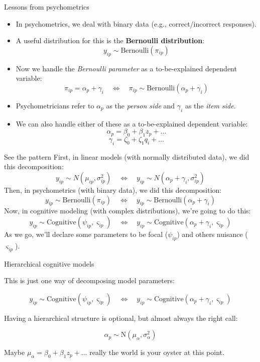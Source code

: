 \documentclass[aspectratio=169]{beamer}
\begin{document}
\begin{frame}[fragile]{Lessons from psychometrics}
    \begin{itemize}
        \item In psychometrics, we deal with binary data (e.g., correct/incorrect responses).
        \pause
        \item A useful distribution for this is the \textbf{Bernoulli distribution}:
        $$y_{ip} \sim \text{Bernoulli}(\pi_{ip})$$
        \pause
        \item Now we handle the \emph{Bernoulli parameter} as a to-be-explained dependent variable:
        $$ \pi_{ip} = \alpha_{p} + \gamma_{i} \quad \Leftrightarrow \quad \pi_{ip} \sim \text{Bernoulli}(\alpha_{p} + \gamma_{i}) $$
        \pause
        \item Psychometricians refer to $\alpha_{p}$ as the \emph{person side} and $\gamma_{i}$ as the \emph{item side}.
        \pause
        \item We can also handle either of these as a to-be-explained dependent variable:
        $$ \alpha_{p} = \beta_0 + \beta_1 z_p + \ldots$$
        $$ \gamma_{i} = \zeta_0 + \zeta_1 q_i + \ldots$$
    \end{itemize}
\end{frame}

\begin{frame}[fragile]{See the pattern}
    First, in linear models (with normally distributed data), we did this decomposition:
    $$y_{ip} \sim {N}(\mu_{ip}, \sigma^2_{ip}) \quad \Leftrightarrow \quad y_{ip} \sim N(\alpha_{p} + \gamma_{i}, \sigma^2_{ip})$$
    \pause
    Then, in psychometrics (with binary data), we did this decomposition:
    $$y_{ip} \sim \text{Bernoulli}(\pi_{ip}) \quad \Leftrightarrow \quad y_{ip} \sim \text{Bernoulli}(\alpha_{p} + \gamma_{i})$$
    \pause
    Now, in cognitive modeling (with complex distributions), we're going to do this:
    $$y_{ip} \sim \text{Cognitive}(\psi_{ip}, \varsigma_{ip}) \quad \Leftrightarrow \quad y_{ip} \sim \text{Cognitive}(\alpha_{p} + \gamma_{i}, \varsigma_{ip})$$
    \pause
    As we go, we'll declare some parameters to be focal ($\psi_{ip}$) and others nuisance ($\varsigma_{ip}$).
\end{frame}

\begin{frame}[fragile]{Hierarchical cognitive models}

    This is just one way of decomposing model parameters:

    $$y_{ip} \sim \text{Cognitive}(\psi_{ip}, \varsigma_{ip}) \quad \Leftrightarrow \quad y_{ip} \sim \text{Cognitive}(\alpha_{p} + \gamma_{i}, \varsigma_{ip})$$

    Having a hierarchical structure is optional, but almost always the right call:

    $$\alpha_{p} \sim \text{N}(\mu_{\alpha}, \sigma^2_{\alpha})$$

    Maybe $\mu_{\alpha} = \beta_0 + \beta_1 z_p + \ldots$ really the world is your oyster at this point.

\end{frame}
\end{document}
